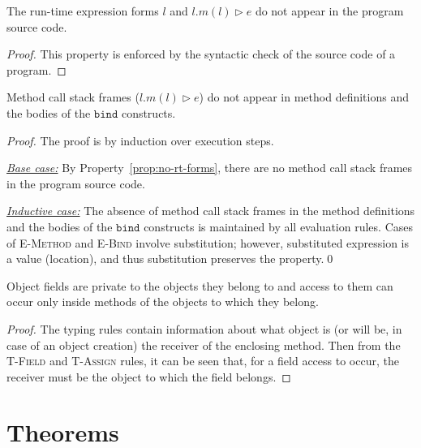 \documentclass{llncs}
\newcommand{\keywadj}[1]{\mathtt{#1}}
\begin{document}
\begin{property}
\label{prop:no-rt-forms}
The run-time expression forms $l$ and $l.m(l) \rhd e$ do not appear in the program source code.
\end{property}

\begin{proof}
This property is enforced by the syntactic check of the source code of a program.
\end{proof}


\begin{property}
\label{prop:mcsf-def-bind}
Method call stack frames ($l.m(l) \rhd e$) do not appear in method definitions and the bodies of the $\keywadj{bind}$ constructs.
\end{property}

\begin{proof}
The proof is by induction over execution steps.

\noindent\underline{\textit{Base case:}} By Property~\ref{prop:no-rt-forms}, there are no method call stack frames in the program source code.

\noindent\underline{\textit{Inductive case:}} The absence of method call stack frames in the method definitions and the bodies of the $\keywadj{bind}$ constructs is maintained by all evaluation rules. Cases of \textsc{E-Method} and \textsc{E-Bind} involve substitution; however, substituted expression is a value (location), and thus substitution preserves the property.\qed
\end{proof}


\begin{property}
\label{prop:fields-private}
Object fields are private to the objects they belong to and access to them can occur only inside methods of the objects to which they belong.
\end{property}

\begin{proof}
\noindent The typing rules contain information about what object is (or will be, in case of an object creation) the receiver of the enclosing method. Then from the \textsc{T-Field} and \textsc{T-Assign} rules, it can be seen that, for a field access to occur, the receiver must be the object to which the field belongs.
\end{proof}


\newpage
\section{Theorems}
\end{document}
